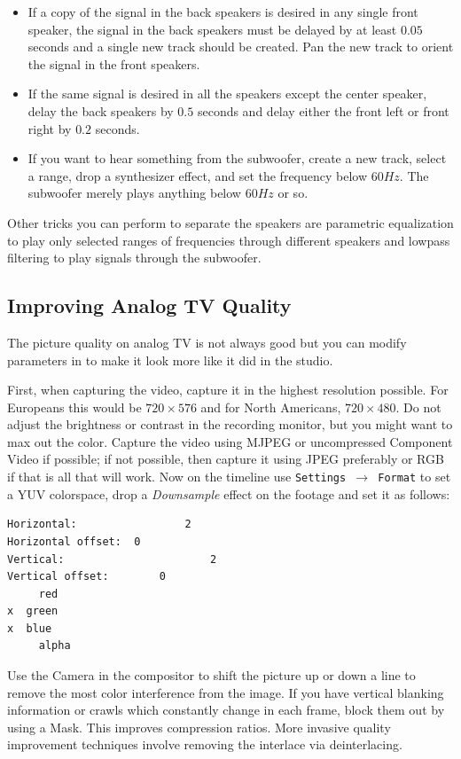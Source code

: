 \begin{itemize}
	\item If a copy of the signal in the back speakers is desired in any single front speaker, the signal in the back
	speakers must be delayed by at least $0.05$ seconds and a single new track should be created. Pan the
	new track to orient the signal in the front speakers.
	\item If the same signal is desired in all the speakers except the center speaker, delay the back speakers by
	$0.5$ seconds and delay either the front left or front right by $0.2$ seconds.
	\item If you want to hear something from the subwoofer, create a new track, select a range, drop a
	synthesizer effect, and set the frequency below $60 Hz$. The subwoofer merely plays anything below
	$60Hz$ or so.
\end{itemize}

Other tricks you can perform to separate the speakers are parametric equalization to play only selected ranges of frequencies through different speakers and lowpass filtering to play signals through the subwoofer.

\subsection{Improving Analog TV Quality}%
\label{sub:improving_tv_quality}

The picture quality on analog TV is not always good but you can modify parameters in \CGG{} to make it look more like it did in the studio.

First, when capturing the video, capture it in the highest resolution possible. For Europeans this would be $720\times576$ and for North Americans, $720\times480$. Do not adjust the brightness or contrast in the recording monitor, but you might want to max out the color. Capture the video using MJPEG or uncompressed Component Video if possible; if not possible, then capture it using JPEG preferably or RGB if that is all that will work.  Now on the timeline use \texttt{Settings $\rightarrow$ Format} to set a YUV colorspace, drop a \textit{Downsample} effect on the footage and set it as follows:

\begin{lstlisting}[numbers=none]
Horizontal:					2
Horizontal offset: 	0
Vertical:						2
Vertical offset: 		0
	 red
x  green
x  blue
	 alpha
\end{lstlisting}

Use the Camera in the compositor to shift the picture up or down a line to remove the most color interference from the image. If you have vertical blanking information or crawls which constantly change in each frame, block them out by using a Mask. This improves compression ratios.   More invasive quality improvement techniques involve removing the interlace via deinterlacing.

